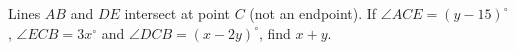 Lines $AB$ and $DE$ intersect at point $C$ (not an endpoint). If $\angle ACE=(y-15)^\circ$, $\angle ECB=3x^\circ$ and $\angle DCB=(x-2y)^\circ$, find $x+y$.
